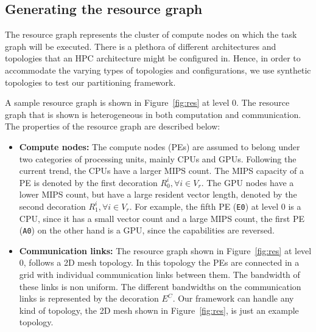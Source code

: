 \subsection{Generating the resource graph}
\label{sec:gener-reso-graph}

The resource graph represents the cluster of compute nodes on which the
task graph will be executed. There is a plethora of different
architectures and topologies that an HPC architecture might be
configured in. Hence, in order to accommodate the varying types of
topologies and configurations, we use synthetic topologies to test our
partitioning framework.

A sample resource graph is shown in Figure~\ref{fig:res} at level 0. The
resource graph that is shown is heterogeneous in both computation and
communication. The properties of the resource graph are described below:

\begin{itemize}

\item \textbf{Compute nodes:} The compute nodes (PEs) are assumed to
  belong under two categories of processing units, mainly CPUs and
  GPUs. Following the current trend, the CPUs have a larger MIPS
  count. The MIPS capacity of a PE is denoted by the first decoration
  $R^i_0, \forall i \in V_r$. The GPU nodes have a lower MIPS count, but
  have a large resident vector length, denoted by the second decoration
  $R^i_1, \forall i \in V_r$. For example, the fifth PE (\texttt{E0}) at
  level 0 is a CPU, since it has a small vector count and a large MIPS
  count, the first PE (\texttt{A0}) on the other hand is a GPU, since
  the capabilities are reversed.



\item \textbf{Communication links:} The resource graph shown in
  Figure~\ref{fig:res} at level 0, follows a 2D mesh topology. In this
  topology the PEs are connected in a grid with individual communication
  links between them. The bandwidth of these links is non uniform. The
  different bandwidths on the communication links is represented by the
  decoration $E^C$. Our framework can handle any kind of topology, the
  2D mesh shown in Figure~\ref{fig:res}, is just an example topology.

\end{itemize}

